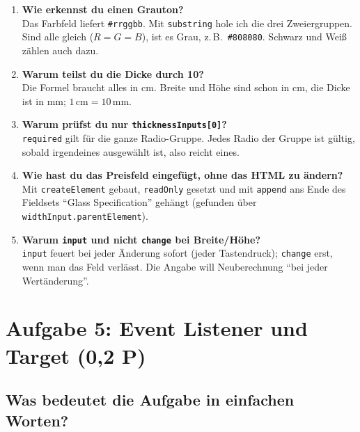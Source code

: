 \documentclass[a4paper,11pt]{article}
\begin{document}
\begin{tutor}
\begin{enumerate}[leftmargin=*]
\item \textbf{Wie erkennst du einen Grauton?}\\
  Das Farbfeld liefert \texttt{\#rrggbb}. Mit \texttt{substring} hole ich die drei Zweiergruppen. Sind alle gleich
  ($R=G=B$), ist es Grau, z.\,B.\ \texttt{\#808080}. Schwarz und Weiß zählen auch dazu.
\item \textbf{Warum teilst du die Dicke durch 10?}\\
  Die Formel braucht alles in cm. Breite und Höhe sind schon in cm, die Dicke ist in mm; $1\,\text{cm} = 10\,\text{mm}$.
\item \textbf{Warum prüfst du nur \texttt{thicknessInputs[0]}?}\\
  \texttt{required} gilt für die ganze Radio-Gruppe. Jedes Radio der Gruppe ist gültig, sobald irgendeines
  ausgewählt ist, also reicht eines.
\item \textbf{Wie hast du das Preisfeld eingefügt, ohne das HTML zu ändern?}\\
  Mit \texttt{createElement} gebaut, \texttt{readOnly} gesetzt und mit \texttt{append} ans Ende des Fieldsets
  "`Glass Specification"' gehängt (gefunden über \texttt{widthInput.parentElement}).
\item \textbf{Warum \texttt{input} und nicht \texttt{change} bei Breite/Höhe?}\\
  \texttt{input} feuert bei jeder Änderung sofort (jeder Tastendruck); \texttt{change} erst, wenn man das Feld
  verlässt. Die Angabe will Neuberechnung "`bei jeder Wertänderung"'.
\end{enumerate}
\end{tutor}

\section{Aufgabe 5: Event Listener und Target (0,2 P)}\label{sec:a5}

\subsection{Was bedeutet die Aufgabe in einfachen Worten?}
\end{document}
